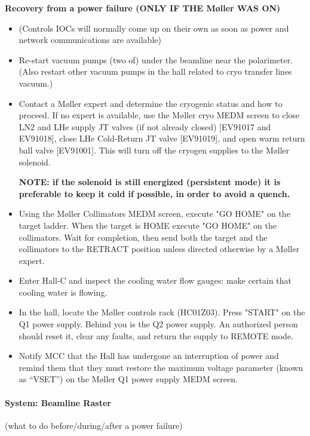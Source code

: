 {\bf Recovery from a power failure (ONLY IF THE M\o ller WAS ON)}
\begin{itemize}
\item (Controls IOCs will normally come up on their own as soon as
power and network communications are available)

\item Re-start vacuum pumps (two of) under the beamline near the
polarimeter. (Also restart other vacuum pumps in the hall related
to cryo transfer lines vacuum.)

\item Contact a M\o ller expert and determine the cryogenic status and
how to proceed. If no expert is available, use the M\o ller cryo MEDM
screen to close LN2 and LHe supply JT valves (if not already closed)
[EV91017 and EV91018], close LHe Cold-Return JT valve [EV91019],
and open warm return ball valve [EV91001]. This will turn off the
cryogen supplies to the M\o ller solenoid.

{\bf NOTE: if the solenoid is still energized (persistent mode) it
is preferable to keep it cold if possible, in order to avoid a
quench.}

\item Using the M\o ller Collimators MEDM screen, execute "GO HOME" on
the target ladder. When the target is HOME execute "GO HOME" on
the collimators. Wait for completion, then send both the target
and the collimators to the RETRACT position unless directed
otherwise by a M\o ller expert.

\item Enter Hall-C and inspect the cooling water flow gauges: make
certain that cooling water is flowing.

\item In the hall, locate the M\o ller controls rack (HC01Z03). Press
"START" on the Q1 power supply. Behind you is the Q2 power supply.
An authorized person should reset it, clear any faults, and return
the supply to REMOTE mode.

\item Notify MCC that the Hall has undergone an interruption of power
and remind them that they must restore the maximum voltage parameter
(known as ``VSET'') on the M\o ller Q1 power supply MEDM screen.

\end{itemize}


\paragraph {System: Beamline Raster}
(what to do before/during/after a power failure)



